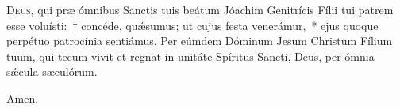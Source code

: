 \lettrine{D}{eus,} qui præ ó\-mnibus San\-ctis tuis beátum Jóachim Genitrícis Fílii tui patrem esse voluísti:~† concéde, quǽsumus; ut cujus festa venerámur,~* ejus quoque perpétuo patrocínia sentiámus. Per eúmdem Dóminum Jesum Christum Fílium tuum, qui tecum vivit et regnat in unitáte Spíritus Sancti, Deus, per ómnia sǽcula sæculórum.

\rr Amen.